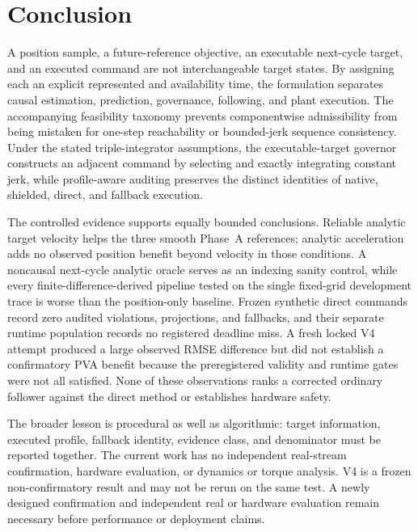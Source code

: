 \section{Conclusion}
\label{sec:conclusion}

A position sample, a future-reference objective, an executable next-cycle
target, and an executed command are not interchangeable target states.  By
assigning each an explicit represented and availability time, the formulation
separates causal estimation, prediction, governance, following, and plant
execution.  The accompanying feasibility taxonomy prevents componentwise
admissibility from being mistaken for one-step reachability or
bounded-jerk sequence consistency.  Under the stated triple-integrator
assumptions, the executable-target governor constructs an adjacent command by
selecting and exactly integrating constant jerk, while profile-aware auditing
preserves the distinct identities of native, shielded, direct, and fallback
execution.

The controlled evidence supports equally bounded conclusions.  Reliable
analytic target velocity helps the three smooth Phase~A references; analytic
acceleration adds no observed position benefit beyond velocity in those
conditions.  A noncausal next-cycle analytic oracle serves as an indexing
sanity control, while every finite-difference-derived pipeline tested on the
single fixed-grid development trace is worse than the position-only baseline.
Frozen synthetic direct commands record zero audited violations, projections,
and fallbacks, and their separate runtime population records no registered
deadline miss.  A fresh locked V4 attempt produced a large observed RMSE
difference but did not establish a confirmatory PVA benefit because the
preregistered validity and runtime gates were not all satisfied.  None of these
observations ranks a corrected ordinary follower against the direct method or
establishes hardware safety.

The broader lesson is procedural as well as algorithmic: target information,
executed profile, fallback identity, evidence class, and denominator must be
reported together.  The current work has no independent real-stream
confirmation, hardware evaluation, or dynamics or torque analysis.  V4 is a
frozen non-confirmatory result and may not be rerun on the same test.  A newly
designed confirmation and independent real or hardware evaluation remain
necessary before performance or deployment claims.
